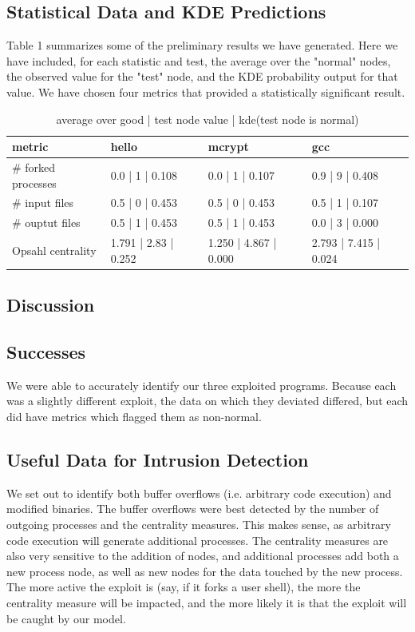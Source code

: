 \documentclass[10pt,twocolumn]{article}
\begin{document}
\subsection{Statistical Data and KDE Predictions}
Table 1 summarizes some of the preliminary results we have generated. Here we have included, for each statistic and test, the average over the "normal" nodes, the observed value for the "test" node, and the KDE probability output for that value. We have chosen four metrics that provided a statistically significant result.
\begin{center}
\begin{table}[ht]
{\small
  \begin{tabular}{| l | l | l | l |}
    \hline
    metric & hello & mcrypt & gcc \\ \hline
     \# forked processes & 0.0 | 1 | 0.108 & 0.0 | 1 | 0.107 & 0.9 | 9 | 0.408 \\ \hline
     \# input files & 0.5 | 0 | 0.453 & 0.5 | 0 | 0.453 & 0.5 | 1 | 0.107 \\ \hline
     \# ouptut files & 0.5 | 1 | 0.453 & 0.5 | 1 | 0.453 & 0.0 | 3 | 0.000 \\ \hline
    Opsahl centrality & 1.791 | 2.83 | 0.252 & 1.250 | 4.867 | 0.000 & 2.793 | 7.415 | 0.024 \\
    \hline
  \end{tabular}
}
\hfill{}
\caption{average over good | test node value | kde(test node is normal)
}
\label{tb:tablename}
\end{table}
\end{center}

\subsection{Discussion}
\subsection{Successes}
We were able to accurately identify our three exploited programs. Because each was a slightly different exploit, the data on which they deviated differed, but each did have metrics which flagged them as non-normal. 
\subsection{Useful Data for Intrusion Detection}
We set out to identify both buffer overflows (i.e. arbitrary code execution) and modified binaries. The buffer overflows were best detected by the number of outgoing processes and the centrality measures. This makes sense, as arbitrary code execution will generate additional processes. The centrality measures are also very sensitive to the addition of nodes, and additional processes add both a new process node, as well as new nodes for the data touched by the new process. The more active the exploit is (say, if it forks a user shell), the more the centrality measure will be impacted, and the more likely it is that the exploit will be caught by our model.
\end{document}
